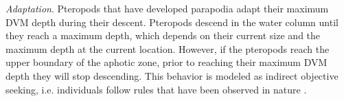 

\textit{Adaptation}. Pteropods that have developed parapodia adapt their maximum DVM depth during their descent. Pteropods descend in the water column until they reach a maximum depth, which depends on their current size and the maximum depth at the current location. However, if the pteropods reach the upper boundary of the aphotic zone, prior to reaching their maximum DVM depth they will stop descending. This behavior is modeled as indirect objective seeking, i.e. individuals follow rules that have been observed in nature \citep{Grimm2010UpdateODD,Grimm2020SecondUpdateODD}. 


